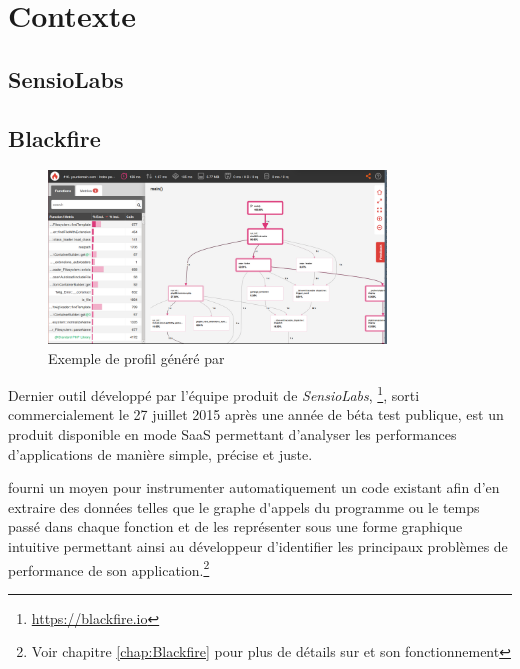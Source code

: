 \setcounter{part}{1}

\chapter{Contexte}
	\setcounter{chapter}{1}
	\section{SensioLabs}



	\section{Blackfire}

\begin{figure}[!h]
\begin{center}
    \includegraphics[width=0.8\textwidth]{images/blackfire-exemple}
  \caption{Exemple de profil généré par \Blackfire}
  \centering
\end{center}
\end{figure}

Dernier outil développé par l'équipe produit de \emph{SensioLabs}, \Blackfire\footnote{\url{https://blackfire.io}},
sorti commercialement le 27 juillet 2015 après une année de béta test publique, est un produit disponible en mode \gls{SaaS} permettant d'analyser les performances d'applications \PHP de manière simple, précise et juste.

\Blackfire fourni un moyen pour instrumenter automatiquement un code \PHP existant afin d'en extraire des données telles que le \gls{graphe d'appels} du programme ou le temps passé dans chaque fonction et de les représenter sous une forme graphique intuitive permettant ainsi au développeur d'identifier les principaux problèmes de performance de son application.\footnote{Voir chapitre \vref{chap:Blackfire} pour plus de détails sur \Blackfire et son fonctionnement}

